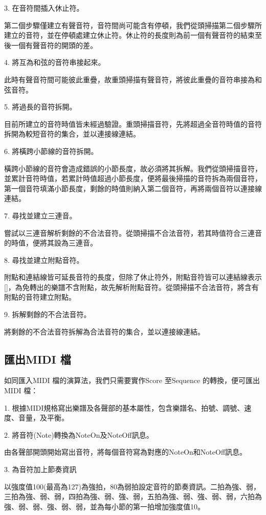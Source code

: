 \documentclass[12pt,a4paper,oneside]{report}
\begin{document}
3. 在音符間插入休止符。 

第二個步驟僅建立有聲音符，音符間尚可能含有停頓，我們從頭掃描第二個步驟所建立的音符，並在停頓處建立休止符。休止符的長度則為前一個有聲音符的結束至後一個有聲音符的開頭的差。

4. 將互為和弦的音符串接起來。 

此時有聲音符間可能彼此重疊，故重頭掃描有聲音符，將彼此重疊的音符串接為和弦音符。

5. 將過長的音符拆開。 

目前所建立的音符時值皆未經過驗證。重頭掃描音符，先將超過全音符時值的音符拆開為較短音符的集合，並以連接線連結。

6. 將橫跨小節線的音符拆開。

橫跨小節線的音符會造成錯誤的小節長度，故必須將其拆解。我們從頭掃描音符，並累計音符時值，若累計時值超過小節長度，便將最後掃描的音符拆為兩個音符，第一個音符填滿小節長度，剩餘的時值則納入第二個音符，再將兩個音符以連接線連結。

7. 尋找並建立三連音。 

嘗試以三連音解析剩餘的不合法音符。從頭掃描不合法音符，若其時值符合三連音的時值，便將其設為三連音。

8. 尋找並建立附點音符。

附點和連結線皆可延長音符的長度，但除了休止符外，附點音符皆可以連結線表示[]，為免轉出的樂譜不含附點，故先解析附點音符。從頭掃描不合法音符，將含有附點的音符建立附點。

9. 拆解剩餘的不合法音符。

將剩餘的不合法音符拆解為合法音符的集合，並以連接線連結。

\subsection{匯出MIDI 檔}

如同匯入MIDI 檔的演算法，我們只需要實作Score 至Sequence 的轉換，便可匯出MIDI 檔：

1. 根據MIDI規格寫出樂譜及各聲部的基本屬性，包含樂譜名、拍號、調號、速度、音量，及平衡。 

2. 將音符(Note)轉換為NoteOn及NoteOff訊息。 

由各聲部開頭開始寫出音符，將每個音符寫為對應的NoteOn和NoteOff訊息。

3. 為音符加上節奏資訊

以強度值100(最高為127)為強拍，80為弱拍設定音符的節奏資訊。二拍為強、弱，三拍為強、弱、弱，四拍為強、弱、強、弱，五拍為強、弱、強、弱、弱，六拍為強、弱、弱、強、弱、弱，並為每小節的第一拍增加強度值10。
\end{document}
